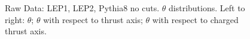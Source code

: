 \begin{figure}[H]
\centering
{}\hfill
{}\hfill
{}\hfill
\caption{Raw Data: LEP1, LEP2, Pythia8 no cuts. $\theta$ distributions. Left to right: $\theta$; $\theta$ with respect to thrust axis; $\theta$ with respect to charged thrust axis.}
\end{figure}


